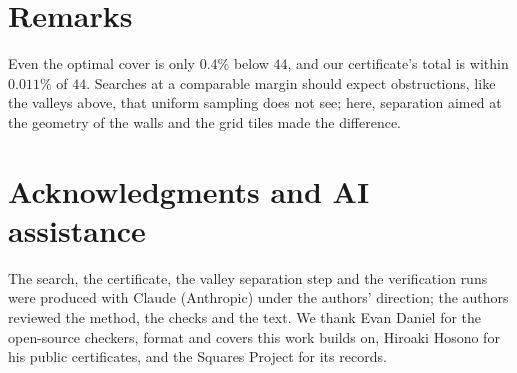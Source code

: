 \documentclass[11pt]{amsart}
\theoremstyle{remark}
\begin{document}
\section{Remarks}

Even the optimal cover is only $0.4\%$ below $44$, and our certificate's total is within $0.011\%$ of $44$. Searches at a comparable
margin should expect obstructions, like the valleys above, that uniform sampling does not see; here, separation
aimed at the geometry of the walls and the grid tiles made the difference.

\section*{Acknowledgments and AI assistance}
The search, the certificate, the valley separation step and the verification runs were produced with Claude
(Anthropic) under the authors' direction; the authors reviewed the method, the checks and the text. We thank
Evan Daniel for the open-source checkers, format and covers this work builds on, Hiroaki Hosono for his public
certificates, and the Squares Project for its records.
\end{document}
